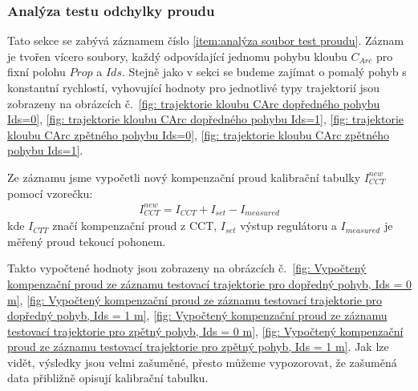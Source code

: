 \subsubsection{Analýza testu odchylky proudu}
Tato sekce se zabývá záznamem číslo \ref{item:analýza soubor test proudu}. Záznam je tvořen vícero soubory, každý odpovídající
jednomu pohybu kloubu $C_{Arc}$ pro fixní polohu $Prop$ a $Ids$. Stejně jako v sekci  se budeme zajímat o pomalý pohyb s konstantní rychlostí, vyhovující hodnoty pro jednotlivé typy trajektorií jsou zobrazeny na obrázcích č.~\ref{fig: trajektorie kloubu CArc dopředného pohybu Ids=0}, \ref{fig: trajektorie kloubu CArc dopředného pohybu Ids=1}, \ref{fig: trajektorie kloubu CArc zpětného pohybu Ids=0}, \ref{fig: trajektorie kloubu CArc zpětného pohybu Ids=1}.\par
Ze záznamu jsme vypočetli nový kompenzační proud kalibrační tabulky $I_{CCT}^{new}$ pomocí vzorečku:
\begin{align}
    I_{CCT}^{new} = I_{CCT} + I_{set} - I_{measured}
\end{align}
kde $I_{CTT}$ značí kompenzační proud z CCT, $I_{set}$ výstup regulátoru a $I_{measured}$ je měřený proud tekoucí pohonem. \par
Takto vypočtené hodnoty jsou zobrazeny na obrázcích č.~\ref{fig: Vypočtený kompenzační proud ze záznamu testovací trajektorie pro dopředný pohyb, Ids = 0 m}, \ref{fig: Vypočtený kompenzační proud ze záznamu testovací trajektorie pro dopředný pohyb, Ids = 1 m}, \ref{fig: Vypočtený kompenzační proud ze záznamu testovací trajektorie pro zpětný pohyb, Ids = 0 m}, \ref{fig: Vypočtený kompenzační proud ze záznamu testovací trajektorie pro zpětný pohyb, Ids = 1 m}. Jak lze vidět, výsledky jsou velmi zašuměné, přesto můžeme vypozorovat, že zašuměná data přibližně opisují kalibrační tabulku.
